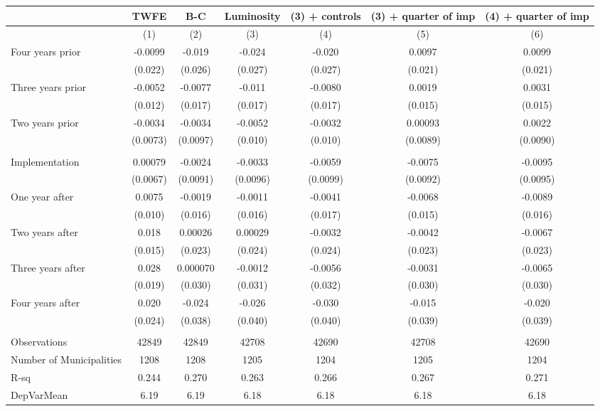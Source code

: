 \begin{tabular}{lcccccc}
\toprule
      & TWFE  & B-C   & Luminosity & (3) + controls & (3) + quarter of imp & (4) + quarter of imp \\
\midrule
      & (1)   & (2)   & (3)   & (4)   & (5)   & (6) \\
\midrule
\midrule
Four years prior & -0.0099 & -0.019 & -0.024 & -0.020 & 0.0097 & 0.0099 \\
      & (0.022) & (0.026) & (0.027) & (0.027) & (0.021) & (0.021) \\
Three years prior & -0.0052 & -0.0077 & -0.011 & -0.0080 & 0.0019 & 0.0031 \\
      & (0.012) & (0.017) & (0.017) & (0.017) & (0.015) & (0.015) \\
Two years prior & -0.0034 & -0.0034 & -0.0052 & -0.0032 & 0.00093 & 0.0022 \\
      & (0.0073) & (0.0097) & (0.010) & (0.010) & (0.0089) & (0.0090) \\
      &       &       &       &       &       &  \\
Implementation & 0.00079 & -0.0024 & -0.0033 & -0.0059 & -0.0075 & -0.0095 \\
      & (0.0067) & (0.0091) & (0.0096) & (0.0099) & (0.0092) & (0.0095) \\
One year after & 0.0075 & -0.0019 & -0.0011 & -0.0041 & -0.0068 & -0.0089 \\
      & (0.010) & (0.016) & (0.016) & (0.017) & (0.015) & (0.016) \\
Two years after & 0.018 & 0.00026 & 0.00029 & -0.0032 & -0.0042 & -0.0067 \\
      & (0.015) & (0.023) & (0.024) & (0.024) & (0.023) & (0.023) \\
Three years after & 0.028 & 0.000070 & -0.0012 & -0.0056 & -0.0031 & -0.0065 \\
      & (0.019) & (0.030) & (0.031) & (0.032) & (0.030) & (0.030) \\
Four years after & 0.020 & -0.024 & -0.026 & -0.030 & -0.015 & -0.020 \\
      & (0.024) & (0.038) & (0.040) & (0.040) & (0.039) & (0.039) \\
      &       &       &       &       &       &  \\
\midrule
Observations & 42849 & 42849 & 42708 & 42690 & 42708 & 42690 \\
Number of Municipalities & 1208  & 1208  & 1205  & 1204  & 1205  & 1204 \\
R-sq  & 0.244 & 0.270 & 0.263 & 0.266 & 0.267 & 0.271 \\
DepVarMean & 6.19  & 6.19  & 6.18  & 6.18  & 6.18  & 6.18 \\
\bottomrule
\bottomrule
\end{tabular}%
